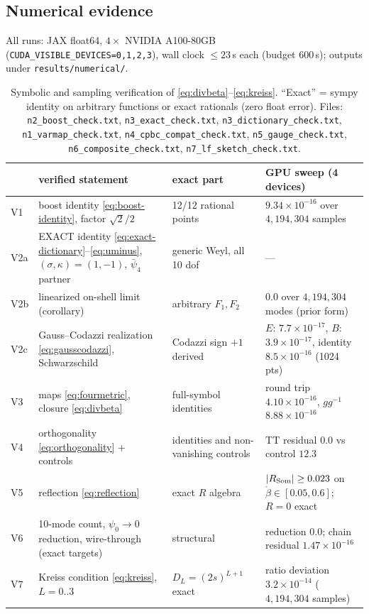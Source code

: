 \subsection{Numerical evidence}
\label{sec:numerics}

All runs: JAX float64, $4\times$ NVIDIA A100-80GB
(\texttt{CUDA\_VISIBLE\_DEVICES=0,1,2,3}), wall clock $\le 23$\,s each
(budget 600\,s); outputs under \texttt{results/numerical/}.

\begin{table}[htbp]
\centering
\caption{Symbolic and sampling verification of
\eqref{eq:divbeta}--\eqref{eq:kreiss}. ``Exact'' = sympy identity on
arbitrary functions or exact rationals (zero float error).
Files: \texttt{n2\_boost\_check.txt}, \texttt{n3\_exact\_check.txt},
\texttt{n3\_dictionary\_check.txt},
\texttt{n1\_varmap\_check.txt}, \texttt{n4\_cpbc\_compat\_check.txt},
\texttt{n5\_gauge\_check.txt}, \texttt{n6\_composite\_check.txt},
\texttt{n7\_lf\_sketch\_check.txt}.}
\label{tab:static}
\footnotesize
\begin{tabular}{llll}
\hline\hline
 & verified statement & exact part & GPU sweep (4 devices) \\
\hline
V1 & boost identity \eqref{eq:boost-identity}, factor $\sqrt2/2$ &
 12/12 rational points & $9.34\times10^{-16}$ over $4{,}194{,}304$ samples \\
V2a & EXACT identity \eqref{eq:exact-dictionary}--\eqref{eq:uminus},
 $(\sigma,\kappa)=(1,-1)$, $\bar\psi_4$ partner & generic Weyl, all 10 dof &
 --- \\
V2b & linearized on-shell limit (corollary) & arbitrary $F_1,F_2$ &
 $0.0$ over $4{,}194{,}304$ modes (prior form) \\
V2c & Gauss--Codazzi realization \eqref{eq:gausscodazzi}, Schwarzschild &
 Codazzi sign $+1$ derived & $E$: $7.7{\times}10^{-17}$, $B$:
 $3.9{\times}10^{-17}$, identity $8.5{\times}10^{-16}$ (1024 pts) \\
V3 & maps \eqref{eq:fourmetric}, closure \eqref{eq:divbeta} &
 full-symbol identities & round trip $4.10{\times}10^{-16}$, $gg^{-1}$ $8.88{\times}10^{-16}$ \\
V4 & orthogonality \eqref{eq:orthogonality} + controls &
 identities and non-vanishing controls & TT residual $0.0$ vs control
 $12.3$ \\
V5 & reflection \eqref{eq:reflection} &
 exact $R$ algebra & $|R_{\rm Som}|\ge0.023$ on
 $\mathring\beta\in[0.05,0.6]$; $R=0$ exact \\
V6 & 10-mode count, $\psi_0\to0$ reduction, wire-through (exact targets) &
 structural & reduction $0.0$; chain residual $1.47{\times}10^{-16}$ \\
V7 & Kreiss condition \eqref{eq:kreiss}, $L=0..3$ &
 $D_L=(2s)^{L+1}$ exact & ratio deviation $3.2\times10^{-14}$
 ($4{,}194{,}304$ samples) \\
\hline\hline
\end{tabular}
\end{table}


